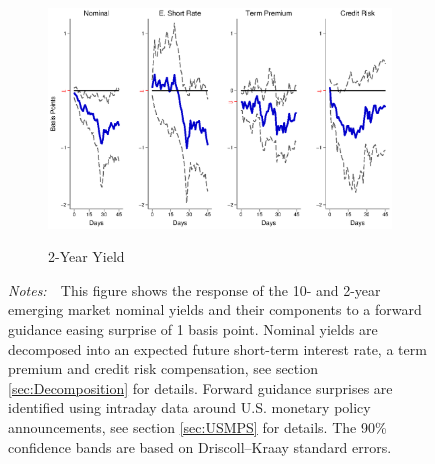 \documentclass[a4paper, 12pt]{article}
\newcommand{\figtext}[1]{
	\vspace{-1ex}
	\captionsetup{justification=justified,font=footnotesize}
	\caption*{#1}
}
\newcommand{\fignotes}[1]{\figtext{\emph{Notes:~}~#1}}
\begin{document}
{\begin{landscape}
\begin{figure}[tbph]
\begin{center}
\begin{minipage}{\linewidth}
\begin{center}
						\begin{subfigure}[t]{\linewidth}
							\includegraphics[trim={0cm 0cm 0cm 0cm},clip,height=0.35\textheight,width=\linewidth]{../Figures/PathEMnomyptpphi24mPre.eps} \\
							\vspace{-0.35cm}
							\caption{2-Year Yield} \label{subfig:LPEM2YpathPre}
						\end{subfigure}
						\vspace{-0.45cm}
					\end{center}
					\fignotes{This figure shows the response of the 10- and 2-year emerging market nominal yields and their components to a forward guidance easing surprise of 1 basis point. Nominal yields are decomposed into an expected future short-term interest rate, a term premium and credit risk compensation, see section \ref{sec:Decomposition} for details. Forward guidance surprises are identified using intraday data around U.S. monetary policy announcements, see section \ref{sec:USMPS} for details. The 90\% confidence bands are based on Driscoll--Kraay standard errors.}
				\end{minipage}
			\end{center}
		\end{figure}
		
		\pagebreak[4]
		

\end{landscape}}
\end{document}
